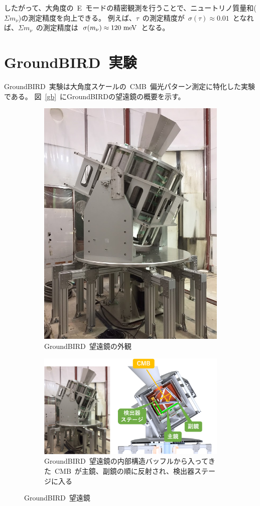 したがって、大角度の~E~モードの精密観測を行うことで、ニュートリノ質量和($\Sigma m_{\nu}$)の測定精度を向上できる。
例えば、$\tau$~の測定精度が~$\sigma (\tau) \approx 0.01$~となれば、$\Sigma m_{\nu}$~の測定精度は~$\sigma (m_{\nu}) \approx 120~{\rm meV}$~となる\cite{plank}。

\section{GroundBIRD~実験}
GroundBIRD~実験は大角度スケールの~CMB~偏光パターン測定に特化した実験である。
図~\ref{gb}~にGroundBIRDの望遠鏡の概要を示す。

\begin{figure}[h]
  \begin{subfigure}[left]{0.4\columnwidth}
    \centering
    \includegraphics[width = 0.4\columnwidth]{2_cosmology/figs/groundBIRD2.png}
    \caption{GroundBIRD~望遠鏡の外観}
  \end{subfigure}
  \centering
  \begin{subfigure}[right]{0.6\columnwidth}
    \includegraphics[width = 0.6\columnwidth]{2_cosmology/figs/gb1.png}
    \caption{GroundBIRD~望遠鏡の内部構造バッフルから入ってきた~CMB~が主鏡、副鏡の順に反射され、検出器ステージに入る}
  \end{subfigure}
  \caption{GroundBIRD~望遠鏡}
\end{figure}

